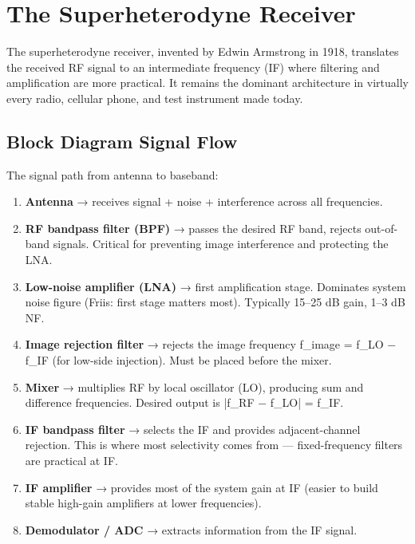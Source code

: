 \section{The Superheterodyne Receiver}\label{sec:wiki_superheterodyne}



The superheterodyne receiver, invented by Edwin Armstrong in 1918, translates the received RF signal to an intermediate frequency (IF) where filtering and amplification are more practical. It remains the dominant architecture in virtually every radio, cellular phone, and test instrument made today.

      

\subsection{Block Diagram Signal Flow}

      

The signal path from antenna to baseband:


      
\begin{enumerate}

        \item \textbf{Antenna} → receives signal + noise + interference across all frequencies.

        \item \textbf{RF bandpass filter (BPF)} → passes the desired RF band, rejects out-of-band signals. Critical for preventing image interference and protecting the LNA.

        \item \textbf{Low-noise amplifier (LNA)} → first amplification stage. Dominates system noise figure (Friis: first stage matters most). Typically 15–25 dB gain, 1–3 dB NF.

        \item \textbf{Image rejection filter} → rejects the image frequency f\_image = f\_LO − f\_IF (for low-side injection). Must be placed before the mixer.

        \item \textbf{Mixer} → multiplies RF by local oscillator (LO), producing sum and difference frequencies. Desired output is |f\_RF − f\_LO| = f\_IF.

        \item \textbf{IF bandpass filter} → selects the IF and provides adjacent-channel rejection. This is where most selectivity comes from — fixed-frequency filters are practical at IF.

        \item \textbf{IF amplifier} → provides most of the system gain at IF (easier to build stable high-gain amplifiers at lower frequencies).

        \item \textbf{Demodulator / ADC} → extracts information from the IF signal.

      
\end{enumerate}

